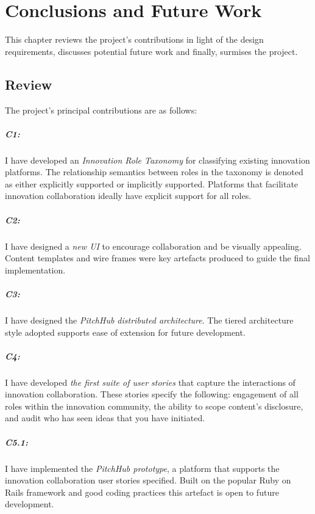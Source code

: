 \chapter{Conclusions and Future Work}
This chapter reviews the project's contributions in light of the design requirements, discusses potential future work and finally, surmises the project.

\section{Review}

The project's principal contributions are as follows:

\paragraph{C1:} I have developed an {\em Innovation Role Taxonomy} for classifying existing innovation platforms. The relationship semantics between roles in the taxonomy is denoted as either explicitly supported or implicitly supported. Platforms that facilitate innovation collaboration ideally have explicit support for all roles.

\paragraph{C2:} I have designed a {\em new UI} to encourage collaboration and be visually appealing. Content templates and wire frames were key artefacts produced to guide the final implementation.

\paragraph{C3:} I have designed the {\em PitchHub distributed architecture}. The tiered architecture style adopted supports ease of extension for future development.

\paragraph{C4:} I have developed {\em the first suite of user stories} that capture the interactions of innovation collaboration. These stories specify the following: engagement of all roles within the innovation community, the ability to scope content's disclosure, and audit who has seen ideas that you have initiated.

\paragraph{C5.1:} I have implemented the {\em PitchHub prototype}, a platform that supports the innovation collaboration user stories specified. Built on the popular Ruby on Rails framework and good coding practices this artefact is open to future development.

